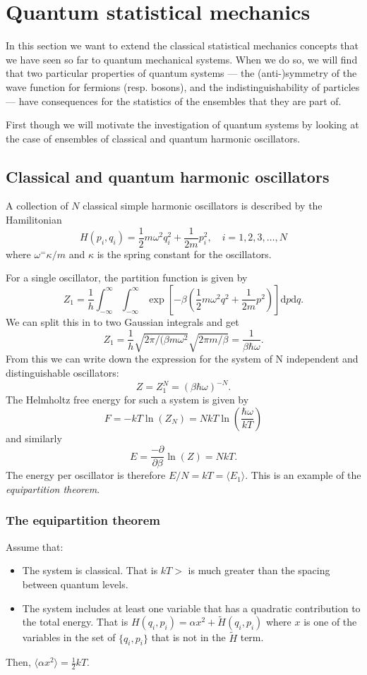 \section{Quantum statistical mechanics}

\newcommand{\bra}[1]{\langle #1 |}
\newcommand{\ket}[1]{| #1 \rangle}
\newcommand{\braket}[2]{\langle #1 | #2\rangle}

In this section we want to extend the classical statistical mechanics concepts that we have seen so far to quantum mechanical systems. When we do so, we will find that two particular properties of quantum systems --- the (anti-)symmetry of the wave function for fermions (resp. bosons), and the indistinguishability of particles --- have consequences for the statistics of the ensembles that they are part of.

First though we will motivate the investigation of quantum systems by looking at the case of ensembles of classical and quantum harmonic oscillators.
\subsection{Classical and quantum harmonic oscillators}
A collection of $N$ classical simple harmonic oscillators is described by the Hamilitonian
\[
	H(p_i,q_i) = \frac12m\omega^2q_i^2+\frac{1}{2m}p_i^2,\quad i=1,2,3,\ldots,N
\]
where $\omega^=\kappa/m$ and $\kappa$ is the spring constant for the oscillators.

For a single oscillator, the partition function is given by 
\[
	Z_1 = \frac{1}{h}\int_{-\infty}^{\infty} \int_{-\infty}^{\infty}\exp\left[-\beta(\frac12m\omega^2q^2+\frac{1}{2m}p^2)\right]\mathrm{d}p\mathrm{d}q.
\]
We can split this in to two Gaussian integrals and get
\[
	Z_1 = \frac{1}{h}\sqrt{2\pi/(\beta m\omega^2}\sqrt{2\pi m/\beta} = \frac{1}{\beta\hbar\omega}.
\]
From this we can write down the expression for the system of N independent and distinguishable oscillators:
\[
	Z = Z_1^N = (\beta\hbar\omega)^{-N}.
\]
The Helmholtz free energy for such a system is given by
\[
	F = -kT\ln(Z_N) = NkT\ln\left(\frac{\hbar\omega}{kT}\right)
\]
and similarly
\[
	E = \frac{-\partial}{\partial\beta}\ln(Z) = NkT.
\]
The energy per oscillator is therefore $E/N = kT =\langle E_1 \rangle$. This is an example of the \emph{equipartition theorem}.

\subsubsection{The equipartition theorem}
Assume that:
\begin{itemize}
	\item The system is classical. That is $kT>$ is much greater than the spacing between quantum levels.
	\item	The system includes at least one variable that has a quadratic contribution to the total energy. That is $H(q_i,p_i) =\alpha x^2 +\widetilde{H}(q_i,p_i)$ where $x$ is one of the variables in the set of $\{q_i,p_i\}$ that is not in the $\widetilde{H}$ term.
\end{itemize}
Then, $\langle\alpha x^2\rangle = \frac12kT$.

